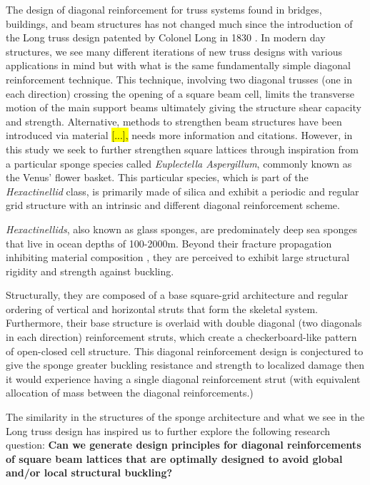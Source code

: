 \documentclass[10pt,twocolumn,twoside]{fernandes_paper}
\newcommand{\mf}[1]{\colorbox{blue!10}{\color{color3}#1}}
\begin{document}
The design of diagonal reinforcement for truss systems found in bridges, buildings, and beam structures has not changed much since the introduction of the Long truss design patented by Colonel Long in 1830 \citep{waddell1916}. In modern day structures, we see many different iterations of new truss designs with various applications in mind but with what is the same fundamentally simple diagonal reinforcement technique. This technique, involving two diagonal trusses (one in each direction) crossing the opening of a square beam cell, limits the transverse motion of the main support beams ultimately giving the structure shear capacity and strength. Alternative, methods to strengthen beam structures have been introduced via material \hl{[...],} \mf{needs more information and citations}. However, in this study we seek to further strengthen square lattices through inspiration from a particular sponge species called \textit{Euplectella Aspergillum}, commonly known as the Venus' flower basket. This particular species, which is part of the \textit{Hexactinellid} class, is primarily made of silica and exhibit a periodic and regular grid structure with an intrinsic and different diagonal reinforcement scheme. 

\textit{Hexactinellids}, also known as glass sponges, are predominately deep sea sponges that live in ocean depths of 100-2000m. Beyond their fracture propagation inhibiting material composition \citep{weaver2007}, they are perceived to exhibit large structural rigidity and strength against buckling. 

Structurally, they are composed of a base square-grid architecture and regular ordering of vertical and horizontal struts that form the skeletal system. Furthermore, their base structure is overlaid with double diagonal (two diagonals in each direction) reinforcement struts, which create a checkerboard-like pattern of open-closed cell structure. This diagonal reinforcement design is conjectured to give the sponge greater buckling resistance and strength to localized damage then it would experience having a single diagonal reinforcement strut (with equivalent allocation of mass between the diagonal reinforcements.) 

The similarity in the structures of the sponge architecture and what we see in the Long truss design has inspired us to further explore the following research question: \textbf{Can we generate design principles for diagonal reinforcements of square beam lattices that are optimally designed to avoid global and/or local structural buckling?} 
\end{document}
